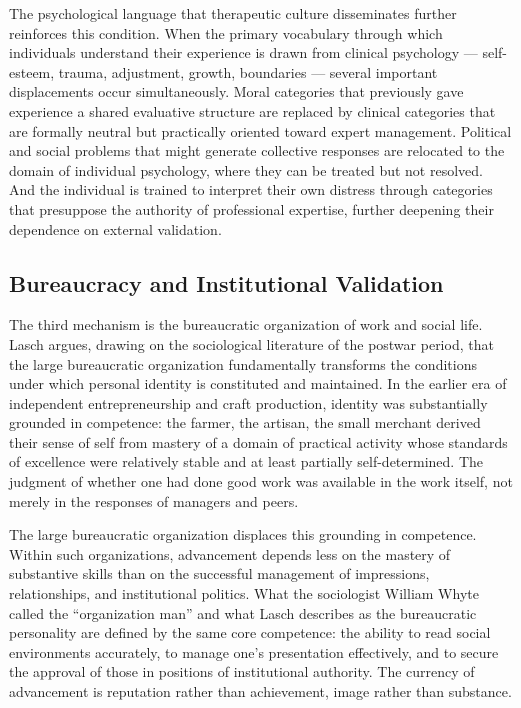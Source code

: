 \documentclass[12pt]{memoir}
\begin{document}
The psychological language that therapeutic culture disseminates further reinforces this
condition. When the primary vocabulary through which individuals understand their experience is
drawn from clinical psychology — self-esteem, trauma, adjustment, growth, boundaries — several
important displacements occur simultaneously. Moral categories that previously gave experience
a shared evaluative structure are replaced by clinical categories that are formally neutral but
practically oriented toward expert management. Political and social problems that might generate
collective responses are relocated to the domain of individual psychology, where they can be
treated but not resolved. And the individual is trained to interpret their own distress through
categories that presuppose the authority of professional expertise, further deepening their
dependence on external validation.\citep[13--14]{lasch1979}

\subsection{Bureaucracy and Institutional Validation}

The third mechanism is the bureaucratic organization of work and social life. Lasch argues,
drawing on the sociological literature of the postwar period, that the large bureaucratic
organization fundamentally transforms the conditions under which personal identity is
constituted and maintained. In the earlier era of independent entrepreneurship and craft
production, identity was substantially grounded in competence: the farmer, the artisan, the
small merchant derived their sense of self from mastery of a domain of practical activity whose
standards of excellence were relatively stable and at least partially self-determined. The
judgment of whether one had done good work was available in the work itself, not merely in the
responses of managers and peers.

The large bureaucratic organization displaces this grounding in competence. Within such
organizations, advancement depends less on the mastery of substantive skills than on the
successful management of impressions, relationships, and institutional politics. What the
sociologist William Whyte called the \enquote{organization man} and what Lasch describes as
the bureaucratic personality are defined by the same core competence: the ability to read
social environments accurately, to manage one's presentation effectively, and to secure the
approval of those in positions of institutional authority. The currency of advancement is
reputation rather than achievement, image rather than substance.\citep[91--94]{lasch1979}
\end{document}
